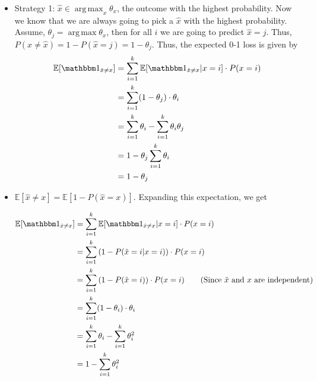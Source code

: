 \documentclass[a4paper]{article}
\theoremstyle{definition}
\DeclareMathOperator*{\argmax}{arg\,max}
\def\E{\mathbb E}
\def\ind{\mathbbm 1}
\begin{document}
\begin{itemize}
    \item Strategy 1: $\hat x \in \argmax_x \theta_x$, the outcome with the highest probability. Now we know that we are always going to pick a $\hat{x}$ with the highest probability. Assume, $\theta_j = \argmax \theta_x$, then for all $i$ we are going to predict $\hat{x} = j$. Thus, $P(x \neq \hat{x}) = 1 - P(\hat{x} = j) = 1 - \theta_j$. Thus, the expected 0-1 loss is given by
    \begin{align*}
        \E[\ind_{\hat x \neq x}] &= \sum_{i=1}^k \E[\ind_{\hat x \neq x} | x=i] \cdot P(x=i) \\
        &= \sum_{i=1}^k (1 - \theta_j) \cdot \theta_i \\
        &= \sum_{i=1}^k \theta_i - \sum_{i=1}^k \theta_i \theta_j \\
        &= 1 - \theta_j \sum_{i=1}^k \theta_i \\
        &= 1 - \theta_j \\
    \end{align*}
    
    \item $\E[\hat{x} \neq x] = \E[1 - P(\hat{x} = x)]$. Expanding this expectation, we get
    
    \begin{align*}
        \E[\ind_{\hat x \neq x}] &= \sum_{i=1}^k \E[\ind_{\hat x \neq x} | x=i] \cdot P(x=i) \\
        &= \sum_{i=1}^k \left(1 - P(\hat{x} = i | x=i)\right) \cdot P(x=i) \\
        &= \sum_{i=1}^k \left(1 - P(\hat{x} = i)\right) \cdot P(x=i) \tag{Since $\hat{x}$ and $x$ are independent}\\
        &= \sum_{i=1}^k (1 - \theta_i) \cdot \theta_i \\
        &= \sum_{i=1}^k \theta_i - \sum_{i=1}^k \theta_i^2 \\
        &= 1 - \sum_{i=1}^k \theta_i^2 \\
    \end{align*}
\end{itemize}
\end{document}
